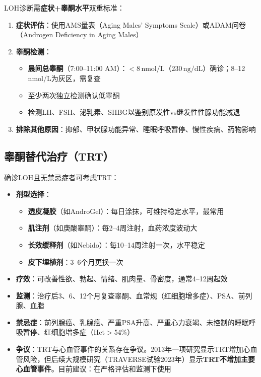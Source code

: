\documentclass[12pt,a4paper,twoside]{ctexbook}
\begin{document}
LOH诊断需\textbf{症状+睾酮水平}双重标准：

\begin{enumerate}
	\item \textbf{症状评估}：使用AMS量表（Aging Males' Symptoms Scale）或ADAM问卷（Androgen Deficiency in Aging Males）
	\item \textbf{睾酮检测}：
		\begin{itemize}
		\item \textbf{晨间总睾酮}（7:00--11:00 AM）：$<8\,\mathrm{nmol/L}$（$230\,\mathrm{ng/dL}$）确诊；8--12 nmol/L为灰区，需复查
		\item 至少两次独立检测确认低睾酮
		\item 检测LH、FSH、泌乳素、SHBG以鉴别原发性vs继发性性腺功能减退
		\end{itemize}
	\item \textbf{排除其他原因}：抑郁、甲状腺功能异常、睡眠呼吸暂停、慢性疾病、药物影响
\end{enumerate}

\subsection{睾酮替代治疗（TRT）}

确诊LOH且无禁忌症者可考虑TRT：

\begin{itemize}[leftmargin=2cm]
	\item \textbf{剂型选择}：
		\begin{itemize}
		\item \textbf{透皮凝胶}（如AndroGel）：每日涂抹，可维持稳定水平，最常用
		\item \textbf{肌注剂}（如庚酸睾酮）：每2--4周注射，血药浓度波动大
		\item \textbf{长效缓释剂}（如Nebido）：每10--14周注射一次，水平稳定
		\item \textbf{皮下埋植剂}：3--6个月更换一次
		\end{itemize}
	\item \textbf{疗效}：可改善性欲、勃起、情绪、肌肉量、骨密度，通常4--12周起效
	\item \textbf{监测}：治疗后3、6、12个月复查睾酮、血常规（红细胞增多症）、PSA、前列腺、血脂
	\item \textbf{禁忌症}：前列腺癌、乳腺癌、严重PSA升高、严重心力衰竭、未控制的睡眠呼吸暂停、红细胞增多症（Hct$>$54\%）
	\item \textbf{争议}：TRT与心血管事件的关系存在争议。2013年一项研究显示TRT增加心血管风险，但后续大规模研究（TRAVERSE试验2023年）显示\textbf{TRT不增加主要心血管事件}。目前建议：在严格评估和监测下使用
\end{itemize}
\end{document}
